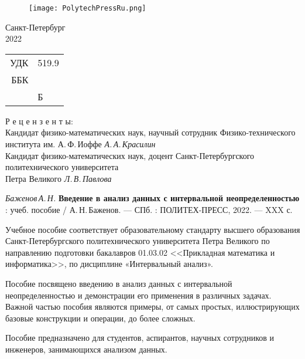 \documentclass[a5paper,openany]{book}
\begin{document}
{\hfill \break		\hfill \break	
\begin{figure}[h]
	\centering
	\texttt{[image: PolytechPressRu.png]}
\end{figure}
\begin{center}\Large{Санкт-Петербург \\
		2022} \end{center}
\thispagestyle{empty} %


\newpage
\begin{tabular}{rl}
УДК & 519.9 \\	
ББК  & ~~~\\
~~~ & Б
\end{tabular}






\begin{center}
	Р е ц е н з е н т ы:\\
	
	Кандидат физико-математических наук, научный сотрудник Физико-технического института им. А.\,Ф.\,Иоффе
	{\it А.\,А.\,Красилин}\\
	Кандидат физико-математических наук, доцент Санкт-Петербургского политехнического  университета \\ Петра Великого {\it Л.\,В.\,Павлова}
\end{center}

{\it Баженов\,А.\,Н.}
{\bf Введение в анализ данных с интервальной неопределенностью} : учеб. пособие /  А.\,Н.\,Баженов.
--- СПб. : ПОЛИТЕХ-ПРЕСС, 2022. --- XXX с.
\hfill \break

{\small 
	Учебное пособие соответствует образовательному стандарту высшего
	образования Санкт-Петербургского политехнического университета Петра Великого по направлению подготовки бакалавров 01.03.02 <<Прикладная математика и информатика>>, по дисциплине «Интервальный анализ».
	
	
	Пособие посвящено введению в анализ данных с интервальной неопределенностью
	и демонстрации его применения в различных задачах.  
	Важной частью пособия являются примеры, от самых простых, иллюстрирующих базовые конструкции и операции, до более сложных.

	Пособие предназначено для студентов, аспирантов, научных сотрудников и инженеров, 
	занимающихся анализом данных.
	
	 
	
}}
\end{document}
